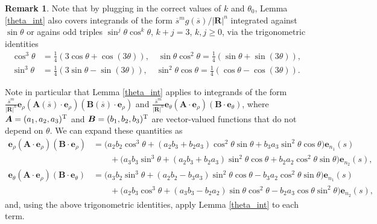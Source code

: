 \documentclass[11pt]{article}
\numberwithin{equation}{section}
\newcommand{\bars}{\overline s}
\newcommand{\be}{\bm{e}}
\newcommand{\abs}[1]{\left\lvert #1 \right\rvert}
\theoremstyle{definition}
\newtheorem{remark}[theorem]{Remark}
\begin{document}
\begin{remark}\label{theta_int_rmk}
Note that by plugging in the correct values of $k$ and $\theta_0$, Lemma \ref{theta_int} also covers integrands of the form $\bars^m g(\bars)/\abs{\bm{R}}^n$ integrated against $\sin\theta$ or agains odd triples $\sin^j\theta\cos^k\theta$, $k+j=3$, $k,j\ge0$, via the trigonometric identities  
\begin{align*}
\cos^3\theta &= \frac{1}{4}(3 \cos\theta + \cos(3\theta)), \quad \sin\theta\cos^2\theta = \frac{1}{4}(\sin\theta + \sin(3 \theta)), \\
\sin^3\theta &= \frac{1}{4}(3 \sin\theta - \sin(3 \theta)), \quad \sin^2\theta\cos\theta = \frac{1}{4}(\cos\theta - \cos(3\theta)).
\end{align*}

Note in particular that Lemma \ref{theta_int} applies to integrands of the form $\frac{\bars^m}{\abs{\bm{R}}^n}\be_\rho(\bm{A}(\bars)\cdot\be_\rho)(\bm{B}(\bars)\cdot\be_\rho)$ and $\frac{\bars^m}{\abs{\bm{R}}^n}\be_\theta(\bm{A}\cdot\be_\rho)(\bm{B}\cdot\be_\theta)$, where $\bm{A}=(a_1,a_2,a_3)^{\rm T}$ and $\bm{B}=(b_1,b_2,b_3)^{\rm T}$ are vector-valued functions that do not depend on $\theta$. We can expand these quantities as
\begin{align*}
\be_\rho(\bm{A}\cdot\be_\rho)(\bm{B}\cdot\be_\rho) &= \big(a_2b_2\cos^3\theta + (a_2b_3+b_2a_3)\cos^2\theta\sin\theta+b_3a_3\sin^2\theta\cos\theta \big)\be_{n_1}(s) \\
&\qquad+\big(a_3b_3\sin^3\theta + (a_2b_3+b_2a_3)\sin^2\theta\cos\theta+b_2a_2\cos^2\theta\sin\theta \big)\be_{n_2}(s), \\
%
\be_\theta(\bm{A}\cdot\be_\rho)(\bm{B}\cdot\be_\theta) &= \big(a_3b_2\sin^3\theta + (a_2b_2-b_3a_3)\sin^2\theta\cos\theta-b_3a_2\cos^2\theta\sin\theta \big)\be_{n_1}(s) \\
&\qquad+\big(a_2b_3\cos^3\theta + (a_3b_3-b_2a_2)\sin\theta\cos^2\theta-b_2a_3\cos\theta\sin^2\theta \big)\be_{n_2}(s),
\end{align*}
and, using the above trigonometric identities, apply Lemma \ref{theta_int} to each term.
\end{remark}

\end{document}

